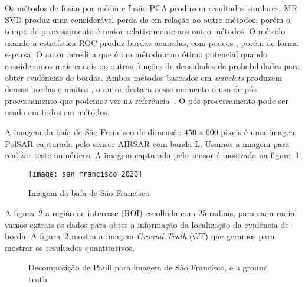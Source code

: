 Os métodos de fusão por média e fusão PCA produzem resultados similares. MR-SVD produz uma considerável perda de  em relação ao outro métodos, porém o tempo de processamento é maior relativamente aos outro métodos. O método usando a estatística ROC produz bordas acuradas, com poucos , porém de forma esparsa. O autor acredita que é um método com ótimo potencial quando consideramos mais canais oo outras funções de densidades de probabilidades para obter evidências de bordas. Ambos métodos baseados em \textit{wavelets} produzem densas bordas e muitos , o autor destaca nesse momento o uso de pós-processamento que podemos ver na referência~\cite{fbgm}. O pós-processamento pode ser usado em todos em métodos. 
      

A imagem da baía de São Francisco de dimensão $450\times 600$ pixeis é uma imagem PolSAR capturada pelo sensor AIRSAR com banda-L. Usamos a imagem para realizar teste numéricos. A imagem capturada pelo sensor é mostrada na figura~\ref{san_francisco}
\begin{figure}[hbt]
	\centering
	\texttt{[image: san\_francisco\_2020]}%
	\caption{Imagem da baía de São Francisco}
\label{san_francisco}
\end{figure}

A figura~\ref{roi_gt} a região de interesse (ROI) escolhida com 25 radiais, para cada radial vamos extrais os dados para obter a informação da localização da evidência de borda. A figura~\ref{roi_gt} mostra a imagem \textit{Ground Truth} (GT) que geramos para mostrar os resultados quantitativos.  
\begin{figure}[hbt]
   \centering
     \caption{Decomposição de Pauli para imagem de São Francisco, e a ground truth}
    \label{roi_gt}
\end{figure}


